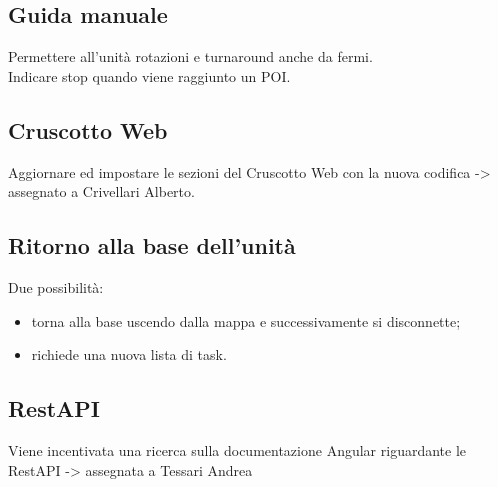 \subsection{Guida manuale}
Permettere all'unità rotazioni e turnaround anche da fermi.\\
Indicare stop quando viene raggiunto un POI.

\subsection{Cruscotto Web}
Aggiornare ed impostare le sezioni del Cruscotto Web con la nuova codifica -> assegnato a Crivellari Alberto.

\subsection{Ritorno alla base dell'unità}
Due possibilità:
\begin{itemize}
	\item torna alla base uscendo dalla mappa e successivamente si disconnette;
	\item richiede una nuova lista di task.
\end{itemize}

\subsection{RestAPI}
Viene incentivata una ricerca sulla documentazione Angular riguardante le RestAPI -> assegnata a Tessari Andrea